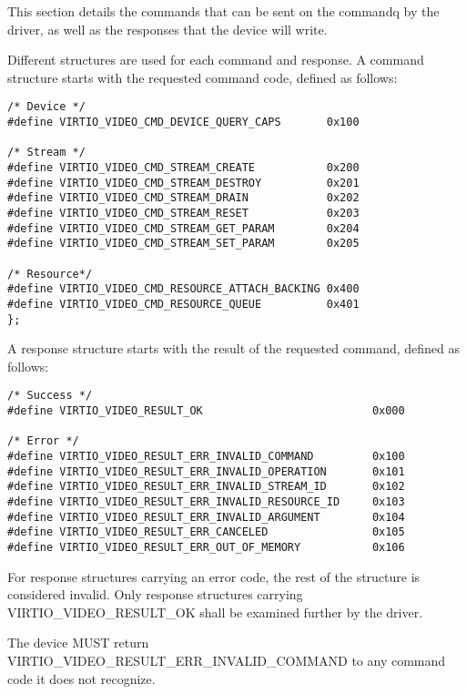 This section details the commands that can be sent on the commandq by
the driver, as well as the responses that the device will write.

Different structures are used for each command and response. A command
structure starts with the requested command code, defined as follows:

\begin{lstlisting}
/* Device */
#define VIRTIO_VIDEO_CMD_DEVICE_QUERY_CAPS       0x100

/* Stream */
#define VIRTIO_VIDEO_CMD_STREAM_CREATE           0x200
#define VIRTIO_VIDEO_CMD_STREAM_DESTROY          0x201
#define VIRTIO_VIDEO_CMD_STREAM_DRAIN            0x202
#define VIRTIO_VIDEO_CMD_STREAM_RESET            0x203
#define VIRTIO_VIDEO_CMD_STREAM_GET_PARAM        0x204
#define VIRTIO_VIDEO_CMD_STREAM_SET_PARAM        0x205

/* Resource*/
#define VIRTIO_VIDEO_CMD_RESOURCE_ATTACH_BACKING 0x400
#define VIRTIO_VIDEO_CMD_RESOURCE_QUEUE          0x401
};
\end{lstlisting}

A response structure starts with the result of the requested command,
defined as follows:

\begin{lstlisting}
/* Success */
#define VIRTIO_VIDEO_RESULT_OK                          0x000

/* Error */
#define VIRTIO_VIDEO_RESULT_ERR_INVALID_COMMAND         0x100
#define VIRTIO_VIDEO_RESULT_ERR_INVALID_OPERATION       0x101
#define VIRTIO_VIDEO_RESULT_ERR_INVALID_STREAM_ID       0x102
#define VIRTIO_VIDEO_RESULT_ERR_INVALID_RESOURCE_ID     0x103
#define VIRTIO_VIDEO_RESULT_ERR_INVALID_ARGUMENT        0x104
#define VIRTIO_VIDEO_RESULT_ERR_CANCELED                0x105
#define VIRTIO_VIDEO_RESULT_ERR_OUT_OF_MEMORY           0x106
\end{lstlisting}

For response structures carrying an error code, the rest of the
structure is considered invalid. Only response structures carrying
VIRTIO_VIDEO_RESULT_OK shall be examined further by the driver.


The device MUST return VIRTIO_VIDEO_RESULT_ERR_INVALID_COMMAND to
any command code it does not recognize.

